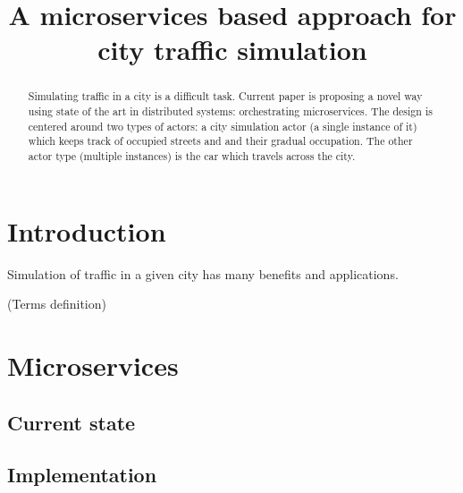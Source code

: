 \documentclass[conference]{IEEEtran}
\begin{document}
\title{A microservices based approach for city traffic simulation}

\author{
\and
{}
}

\maketitle

\begin{abstract}
Simulating traffic in a city is a difficult task. Current paper is proposing a novel way using state of the art in distributed systems: orchestrating microservices. The design is centered around two types of actors: a city simulation actor (a single instance of it) which keeps track of occupied streets and and their gradual occupation. The other actor type (multiple instances) is the car which travels across the city.
\end{abstract}

\section{Introduction}
Simulation of traffic in a given city has many benefits and applications. 

(Terms definition)

\section{Microservices}

\subsection{Current state}

\subsection{Implementation}
\end{document}
